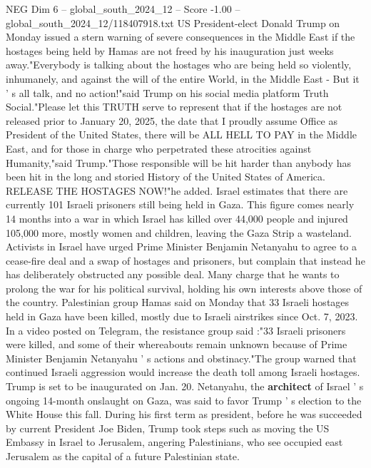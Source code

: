 \begin{textsample}{NEG Dim 6 – global\_south\_2024\_12 – Score -1.00 – global\_south\_2024\_12/118407918.txt}  \label{ex:f6_neg_118}
US President-elect Donald Trump on Monday issued a stern warning of severe consequences in the Middle East if the hostages being held by Hamas are not freed by his inauguration just weeks away."Everybody is talking about the hostages who are being held so violently, inhumanely, and against the will of the entire World, in the Middle East - But it ' s all talk, and no action!"said Trump on his social media platform Truth Social."Please let this TRUTH serve to represent that if the hostages are not released prior to January 20, 2025, the date that I proudly assume Office as President of the United States, there will be ALL HELL TO PAY in the Middle East, and for those in charge who perpetrated these atrocities against Humanity,"said Trump."Those responsible will be hit harder than anybody has been hit in the long and storied History of the United States of America.
RELEASE THE HOSTAGES NOW!"he added.
Israel estimates that there are currently 101 Israeli prisoners still being held in Gaza.
This figure comes nearly 14 months into a war in which Israel has killed over 44,000 people and injured 105,000 more, mostly women and children, leaving the Gaza Strip a wasteland.
Activists in Israel have urged Prime Minister Benjamin Netanyahu to agree to a cease-fire deal and a swap of hostages and prisoners, but complain that instead he has deliberately obstructed any possible deal.
Many charge that he wants to prolong the war for his political survival, holding his own interests above those of the country.
Palestinian group Hamas said on Monday that 33 Israeli hostages held in Gaza have been killed, mostly due to Israeli airstrikes since Oct. 7, 2023.
In a video posted on Telegram, the resistance group said :"33 Israeli prisoners were killed, and some of their whereabouts remain unknown because of Prime Minister Benjamin Netanyahu ' s actions and obstinacy."The group warned that continued Israeli aggression would increase the death toll among Israeli hostages.
Trump is set to be inaugurated on Jan. 20.
Netanyahu, the \textbf{architect} of Israel ' s ongoing 14-month onslaught on Gaza, was said to favor Trump ' s election to the White House this fall.
During his first term as president, before he was succeeded by current President Joe Biden, Trump took steps such as moving the US Embassy in Israel to Jerusalem, angering Palestinians, who see occupied east Jerusalem as the capital of a future Palestinian state.

\end{textsample}
